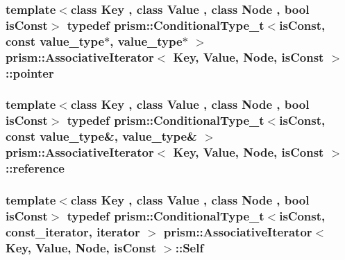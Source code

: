 \subsubsection[{\texorpdfstring{pointer}{pointer}}]{\setlength{\rightskip}{0pt plus 5cm}template$<$class Key , class Value , class Node , bool is\+Const$>$ typedef {\bf prism\+::\+Conditional\+Type\+\_\+t}$<$is\+Const, const {\bf value\+\_\+type}$\ast$, {\bf value\+\_\+type}$\ast$ $>$ {\bf prism\+::\+Associative\+Iterator}$<$ Key, Value, Node, is\+Const $>$\+::{\bf pointer}}\hypertarget{structprism_1_1_associative_iterator_a8fcf3ad67041397687eb5ae187312d17}{}\label{structprism_1_1_associative_iterator_a8fcf3ad67041397687eb5ae187312d17}
\subsubsection[{\texorpdfstring{reference}{reference}}]{\setlength{\rightskip}{0pt plus 5cm}template$<$class Key , class Value , class Node , bool is\+Const$>$ typedef {\bf prism\+::\+Conditional\+Type\+\_\+t}$<$is\+Const, const {\bf value\+\_\+type}\&, {\bf value\+\_\+type}\& $>$ {\bf prism\+::\+Associative\+Iterator}$<$ Key, Value, Node, is\+Const $>$\+::{\bf reference}}\hypertarget{structprism_1_1_associative_iterator_aab7cac291580847e204cb7c8ca90ddc8}{}\label{structprism_1_1_associative_iterator_aab7cac291580847e204cb7c8ca90ddc8}
\subsubsection[{\texorpdfstring{Self}{Self}}]{\setlength{\rightskip}{0pt plus 5cm}template$<$class Key , class Value , class Node , bool is\+Const$>$ typedef {\bf prism\+::\+Conditional\+Type\+\_\+t}$<$is\+Const, {\bf const\+\_\+iterator}, {\bf iterator} $>$ {\bf prism\+::\+Associative\+Iterator}$<$ Key, Value, Node, is\+Const $>$\+::{\bf Self}}\hypertarget{structprism_1_1_associative_iterator_af8bb51b69b4eca7c0ec7ba4887833877}{}\label{structprism_1_1_associative_iterator_af8bb51b69b4eca7c0ec7ba4887833877}
